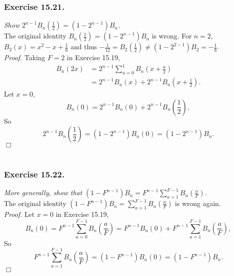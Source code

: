 \documentclass{article}
\begin{document}



\subsubsection*{Exercise 15.21.}
\emph{Show $2^{n-1} B_n(\frac{1}{2}) = (1 - 2^{n-1})B_n$.} \\

The original identity $B_n(\frac{1}{2}) = (1 - 2^{n-1})B_n$ is wrong.
For $n = 2$, $B_2(x) = x^2 - x + \frac{1}{6}$ and thus
$-\frac{1}{12} = B_2(\frac{1}{2}) \neq (1 - 2^{2-1})B_2 = -\frac{1}{6}$. \\

\emph{Proof.}
Taking $F = 2$ in Exercise 15.19,
\begin{align*}
B_n(2x)
&= 2^{n-1} \sum_{a = 0}^{1} B_n\left( x + \frac{a}{2} \right) \\
&= 2^{n-1} B_n(x) + 2^{n-1} B_n\left( x + \frac{1}{2} \right).
\end{align*}
Let $x = 0$,
$$B_n(0) = 2^{n-1} B_n(0) + 2^{n-1} B_n\left( \frac{1}{2} \right), $$
So
$$2^{n-1} B_n\left( \frac{1}{2} \right)
= (1 - 2^{n-1}) B_n(0)
= (1 - 2^{n-1}) B_n.$$
$\Box$ \\\\






\subsubsection*{Exercise 15.22.}
\emph{More generally, show that
$(1 - F^{n-1})B_n = F^{n-1} \sum_{a=1}^{F-1} B_n(\frac{a}{F})$.} \\

The original identity $(1 - F^{n-1})B_n = \sum_{a=1}^{F-1} B_n(\frac{a}{F})$
is wrong again. \\

\emph{Proof.}
Let $x = 0$ in Exercise 15.19,
$$B_n(0)
= F^{n-1} \sum_{a=0}^{F-1} B_n\left( \frac{a}{F} \right)
= F^{n-1} B_n(0) + F^{n-1} \sum_{a=1}^{F-1} B_n\left( \frac{a}{F} \right), $$
So
$$F^{n-1} \sum_{a=1}^{F-1} B_n\left( \frac{a}{F} \right)
= (1 - F^{n-1}) B_n(0)
= (1 - F^{n-1}) B_n.$$
$\Box$ \\\\



\end{document}
